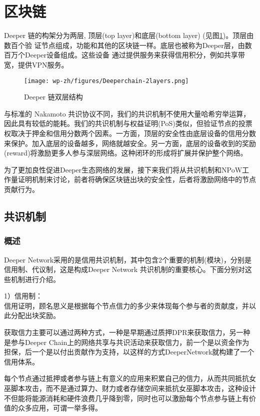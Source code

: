 \documentclass[a4paper]{article}
\begin{document}
\newpage
\section{区块链}
Deeper 链的构架分为两层, 顶层(top layer)和底层(bottom layer) (见图\ref{fig:2-layers})。顶层由数百个验
证节点组成，功能和其他的区块链一样。底层也被称为Deeper层，由数百万个Deeper设备组成。这些设备 通过提供服务来获得信用积分，例如共享带宽，提供VPN服务。

\begin{figure}[hhhh]
\centering
\texttt{[image: wp-zh/figures/Deeperchain-2layers.png]}
\caption{Deeper 链双层结构}
\label{fig:2-layers}
\end{figure}

与标准的 Nakamoto 共识协议不同，我们的共识机制不使用大量哈希穷举运算，因此具有较低的能耗。我们的共识机制与权益证明(PoS)类似，但验证节点的投票权取决于押金和信用分数两个因素。一方面，顶层的安全性由底层设备的信用分数来保护。加入底层的设备越多，网络就越安全。另一方面，底层的设备收到的奖励(reward)将激励更多人参与深层网络。这种闭环的形成将扩展并保护整个网络。

为了更加良性促进Deeper生态网络的发展，接下来我们将从共识机制和NPoW工作量证明机制来讨论，前者将确保区块链出块的安全性，后者将激励网络中的节点贡献行为。

\subsection{共识机制}
\subsubsection{概述}
Deeper Network采用的是信用共识机制，其中包含2个重要的机制(模块)，分别是信用制、代议制，这是构成Deeper Network 共识机制的重要核心。下面分别对这些机制进行介绍。

1）信用制：\\
信用证明，顾名思义是根据每个节点信力的多少来体现每个参与者的贡献度，并以此分配出块奖励。

获取信力主要可以通过两种方式，一种是早期通过质押DPR来获取信力，另一种是参与Deeper Chain上的网络共享与共识活动来获取信力，前一个是以资金作为担保，后一个是以付出贡献作为支持，以这样的方式DeeperNetwork就构建了一个信用体系。

每个节点通过抵押或者参与链上有意义的应用来积累自己的信力，从而共同抵抗女巫脚本攻击，而不是通过算力、财力或者存储空间来抵抗女巫脚本攻击，这种设计不但能将能源消耗和硬件浪费几乎降到零，同时也可以激励每个节点参与链上有价值的众多应用，可谓一举多得。
\end{document}

